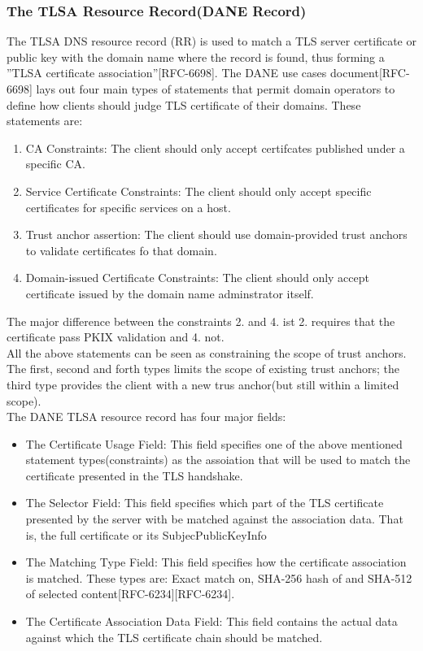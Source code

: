 \subsubsection{The TLSA Resource Record(DANE Record)}
The TLSA DNS resource record (RR) is used to match a TLS server certificate or public key with  the domain name where the record is found, thus forming a ''TLSA certificate association''[RFC-6698]. The DANE use cases document[RFC-6698] lays out four main types of statements that permit domain operators to define how clients should judge TLS certificate of their domains. These statements are:
\begin{enumerate}
\item CA Constraints: The client should only accept certifcates published under a specific CA.
\item Service Certificate Constraints: The client should only accept specific certificates for specific services on a host.
\item Trust anchor assertion: The client should use domain-provided trust anchors to validate certificates fo that domain. 
\item Domain-issued Certificate Constraints: The client should only accept certificate issued by the domain name adminstrator itself.
\end{enumerate}
The major difference between the constraints 2. and 4. ist 2. requires that the certificate pass PKIX validation and 4. not.\\
All the above statements can be seen as constraining the scope of trust anchors. The first, second and forth types limits the scope of existing trust anchors; the third type provides the client with a new trus anchor(but still within a limited scope).\\
\indent The DANE TLSA resource record has four major fields:
\begin{itemize}
\item The Certificate Usage Field: This field specifies one of the above mentioned statement types(constraints) as the assoiation that will be used to match the certificate presented in the TLS handshake.
\item The Selector Field: This field specifies which part of the TLS certificate presented by the server with be matched against the association data. That is, the full certificate or its SubjecPublicKeyInfo
\item The Matching Type Field: This field specifies how the certificate association is matched. These types are: Exact match on, SHA-256 hash of and SHA-512 of  selected content[RFC-6234][RFC-6234].
\item The Certificate Association Data Field: This field contains the actual data against which the TLS certificate chain should be matched.
\end{itemize}

